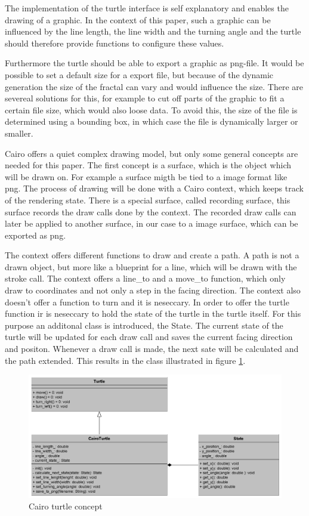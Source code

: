 \documentclass[english]{cpp-hmwk}
\begin{document}
The implementation of the turtle interface is self explanatory and enables the drawing of a graphic. In the context of this paper, such a graphic can be influenced by the line length, the line width and the turning angle and the turtle should therefore provide functions to configure these values.

Furthermore the turtle should be able to export a graphic as png-file. It would be possible to set a default size for a export file, but because of the dynamic generation the size of the fractal can vary and would influence the size. There are severeal solutions for this, for example to cut off parts of the graphic to fit a certain file size, which would also loose data. To avoid this, the size of the file is determined using a bounding box, in which case the file is dynamically larger or smaller.\newline

\noindent Cairo offers a quiet complex drawing model, but only some general concepts are needed for this paper. The first concept is a surface, which is the object which will be drawn on. For example a surface migth be tied to a image format like png. The process of drawing will be done with a Cairo context, which keeps track of the rendering state. There is a special surface, called recording surface, this surface records the draw calls done by the context. The recorded draw calls can later be applied to another surface, in our case to a image surface, which can be exported as png.

The context offers different functions to draw and create a path. A path is not a drawn object, but more like a blueprint for a line, which will be drawn with the stroke call. The context offers a line\_to and a move\_to function, which only draw to coordinates and not only a step in the facing direction. The context also doesn't offer a function to turn and it is neseccary. In order to offer the turtle function ir is neseccary to hold the state of the turtle in the turtle itself. For this purpose an additonal class is introduced, the State. The current state of the turtle will be updated for each draw call and saves the current facing direction and positon. Whenever a draw call is made, the next sate will be calculated and the path extended. This results in the class illustrated in figure \ref{figure:cairoturtle}.

\begin{figure}[h!]
	\centering
	\includegraphics[width=1\columnwidth]{../graphs/LSystem/examples/class_cairo_turtle.png}
	\caption{Cairo turtle concept}
	\label{figure:cairoturtle}
\end{figure}
\end{document}
